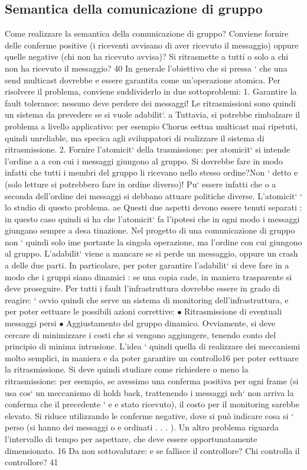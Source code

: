 \documentclass[a4paper,12pt]{article}
\begin{document}
\subsection{Semantica della comunicazione di gruppo}
Come realizzare la semantica della comunicazione di gruppo? Conviene fornire
delle conferme positive (i riceventi avvisano di aver ricevuto il messaggio) oppure
quelle negative (chi non ha ricevuto avvisa)? Si ritrasmette a tutti o solo a chi
non ha ricevuto il messaggio?
40
In generale l'obiettivo che si pressa ` che una send multicast dovrebbe
e
essere garantita come un'operazione atomica. Per risolvere il problema, conviene
suddividerlo in due sottoproblemi:
1. Garantire la fault tolerance: nessuno deve perdere dei messaggi! Le ritrasmissioni sono quindi un sistema da
prevedere se si vuole adabilit`.
a
Tuttavia, si potrebbe rimbalzare il problema a livello applicativo: per
esempio Chorus eettua multicast mai ripetuti, quindi unreliable, ma
specica agli sviluppatori di realizzare il sistema di ritrasmissione.
2. Fornire l'atomicit` della trasmissione: per atomicit` si intende l'ordine
a
a
con cui i messaggi giungono al gruppo. Si dovrebbe fare in modo infatti
che tutti i membri del gruppo li ricevano nello stesso ordine?Non ` detto
e
(solo letture si potrebbero fare in ordine diverso)! Pu` essere infatti che
o
a seconda dell'ordine dei messaggi si debbano attuare politiche diverse.
L'atomicit` ` lo studio di questo problema.
ae
Questi due aspetti devono essere tenuti separati : in questo caso quindi si ha
che l'atomicit` fa l'ipotesi che in ogni modo i messaggi giungano sempre a desa
tinazione. Nel progetto di una comunicazione di gruppo non ` quindi solo ime
portante la singola operazione, ma l'ordine con cui giungono al gruppo.
L'adabilit` viene a mancare se si perde un messaggio, oppure un crash
a
delle due parti. In particolare, per poter garantire l'adabilit` si deve fare in
a
modo che i gruppi siano dinamici : se una copia cade, in maniera trasparente
si deve proseguire. Per tutti i fault l'infrastruttura dovrebbe essere in grado di
reagire: ` ovvio quindi che serve un sistema di monitoring dell'infrastruttura,
e
per poter eettuare le possibili azioni correttive:
$\bullet$ Ritrasmissione di eventuali messaggi persi
$\bullet$ Aggiustamento del gruppo dinamico.
Ovviamente, si deve cercare di minimizzare i costi che si vengono aggiungere,
tenendo conto del principio di minima intrusione.
L'idea ` quindi quella di realizzare dei meccanismi molto semplici, in maniera
e
da poter garantire un controllo16 per poter eettuare la ritrasmissione. Si deve
quindi studiare come richiedere o meno la ritrasmissione: per esempio, se avessimo una conferma positiva per ogni frame
(si usa cos` un meccanismo di hold\i{}
back, trattenendo i messaggi nch` non arriva la conferma che il precedente `
e
e
stato ricevuto), il costo per il monitoring sarebbe elevato. Si riduce utilizzando
le conferme negative, dove si può indicare cosa si ` perso (si hanno dei messaggi
o
e
ordinati . . . ). Un altro problema riguarda l'intervallo di tempo per aspettare,
che deve essere opportunatamente dimensionato.
16 Da
non sottovalutare: e se fallisce il controllore? Chi controlla il controllore?
41
\end{document}
